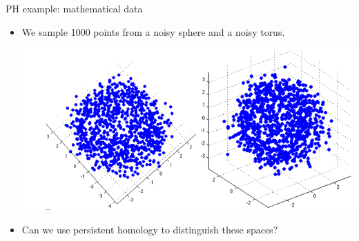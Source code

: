 \documentclass[usenames,dvipsnames,aspectratio=1610]{beamer}
\begin{document}
\begin{frame}{PH example: mathematical data}
  \begin{itemize}
    \item We sample 1000 points from a noisy sphere and a noisy torus.
      \begin{center}
	\includegraphics[scale=0.5]{sphere_tor.png}
      \end{center}
    \item Can we use persistent homology to distinguish these spaces?
  \end{itemize}
\end{frame}
\end{document}

